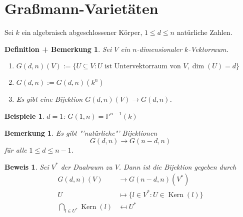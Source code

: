 \documentclass[a4paper,12pt]{report}
\theoremstyle{break}
\newtheorem{DefBem}[Def]{Definition + Bemerkung}
\newtheorem{Bem}[Def]{Bemerkung}
\theoremstyle{nonumberbreak}
\newtheorem{nnBsp}{Beispiele}
\theoremstyle{nonumberplain}
\newtheorem{Bew}{Beweis}
\DeclareMathOperator{\Kern}{Kern}
\begin{document}


\section{Graßmann-Varietäten}
Sei $k$ ein algebraisch abgeschlossener Körper, $1\leq d \leq n$ natürliche Zahlen.
\begin{DefBem}
\label{defbem:12.1}
Sei $V$ ein $n$-dimensionaler $k$-Vektorraum.
\begin{enumerate}
\item $G(d,n)(V):=\{U\subseteq V: U \text{~ist~Untervektorraum~von~} V, \dim(U)=d\}$
\item $G(d,n):= G(d,n)(k^n)$
\item Es gibt eine Bijektion $G(d,n)(V)\rightarrow G(d,n)$.
\end{enumerate}
\end{DefBem}
\begin{nnBsp}
$d=1$: $G(1,n)= \mathbb{P}^{n-1}(k)$
\end{nnBsp}
\begin{Bem}
\label{bem: 12.2}
Es gibt "'natürliche"' Bijektionen 
$$G(d,n) \rightarrow G(n-d,n)$$
für alle $1\leq d\leq n-1$.
\end{Bem}
\begin{Bew}
Sei $V^*$ der Dualraum zu $V$. Dann ist die Bijektion gegeben durch 
\begin{align*}
G(d,n)(V)&\rightarrow G(n-d,n)(V^*)\\
U&\mapsto \{l\in V^*:U\in\Kern(l)\}\\
\bigcap_{l\in U^*}\Kern(l)&\mapsfrom U^*
\end{align*}
\end{Bew}
\end{document}
